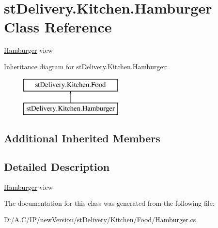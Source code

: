 \hypertarget{classst_delivery_1_1_kitchen_1_1_hamburger}{}\section{st\+Delivery.\+Kitchen.\+Hamburger Class Reference}
\label{classst_delivery_1_1_kitchen_1_1_hamburger}


\hyperlink{classst_delivery_1_1_kitchen_1_1_hamburger}{Hamburger} view  


Inheritance diagram for st\+Delivery.\+Kitchen.\+Hamburger\+:\begin{figure}[H]
\begin{center}
\leavevmode
\includegraphics[height=2.000000cm]{classst_delivery_1_1_kitchen_1_1_hamburger}
\end{center}
\end{figure}
\subsection*{Additional Inherited Members}


\subsection{Detailed Description}
\hyperlink{classst_delivery_1_1_kitchen_1_1_hamburger}{Hamburger} view 



The documentation for this class was generated from the following file\+:\begin{DoxyCompactItemize}
\item 
D\+:/\+A.\+C/\+I\+P/new\+Version/st\+Delivery/\+Kitchen/\+Food/Hamburger.\+cs\end{DoxyCompactItemize}
